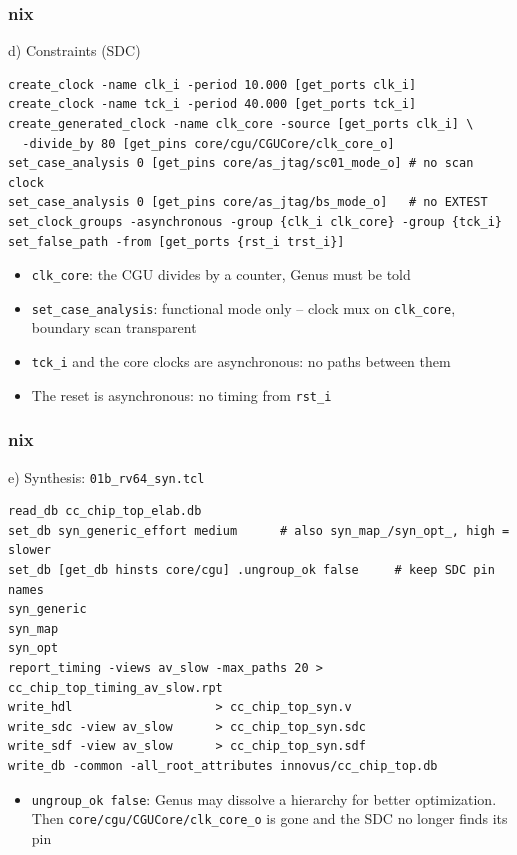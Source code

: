 \documentclass{beamer}
\newcommand{\astitle}{nix}
\newcommand{\assubtitle}{nix}
\newcommand{\cmd}[1]{\texttt{#1}}
\begin{document}
\renewcommand{\assubtitle}{d) Constraints (SDC)}
\begin{frame}[fragile]
\frametitle{\astitle}
\begin{block}{\assubtitle}
\begin{lstlisting}[style=sh]
create_clock -name clk_i -period 10.000 [get_ports clk_i]
create_clock -name tck_i -period 40.000 [get_ports tck_i]
create_generated_clock -name clk_core -source [get_ports clk_i] \
  -divide_by 80 [get_pins core/cgu/CGUCore/clk_core_o]
set_case_analysis 0 [get_pins core/as_jtag/sc01_mode_o] # no scan clock
set_case_analysis 0 [get_pins core/as_jtag/bs_mode_o]   # no EXTEST
set_clock_groups -asynchronous -group {clk_i clk_core} -group {tck_i}
set_false_path -from [get_ports {rst_i trst_i}]
\end{lstlisting}
  \begin{itemize}
    \item \cmd{clk\_core}: the CGU divides by a counter, Genus must be told
    \item \cmd{set\_case\_analysis}: functional mode only -- clock mux on
      \cmd{clk\_core}, boundary scan transparent
    \item \cmd{tck\_i} and the core clocks are asynchronous: no paths between them
    \item The reset is asynchronous: no timing from \cmd{rst\_i}
  \end{itemize}
\end{block}
\end{frame}

\renewcommand{\assubtitle}{e) Synthesis: \texttt{01b\_rv64\_syn.tcl}}
\begin{frame}[fragile]
\frametitle{\astitle}
\begin{block}{\assubtitle}
  \footnotesize
\begin{lstlisting}[style=sh]
read_db cc_chip_top_elab.db
set_db syn_generic_effort medium      # also syn_map_/syn_opt_, high = slower
set_db [get_db hinsts core/cgu] .ungroup_ok false     # keep SDC pin names
syn_generic
syn_map
syn_opt
report_timing -views av_slow -max_paths 20 > cc_chip_top_timing_av_slow.rpt
write_hdl                    > cc_chip_top_syn.v
write_sdc -view av_slow      > cc_chip_top_syn.sdc
write_sdf -view av_slow      > cc_chip_top_syn.sdf
write_db -common -all_root_attributes innovus/cc_chip_top.db
\end{lstlisting}
  \begin{itemize}
    \item \cmd{ungroup\_ok false}: Genus may dissolve a hierarchy for better
      optimization. Then \cmd{core/cgu/CGUCore/clk\_core\_o} is gone and the SDC
      no longer finds its pin
  \end{itemize}
\end{block}
\end{frame}
\end{document}
